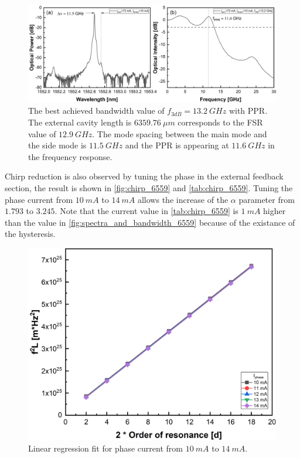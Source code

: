 \begin{figure}[ht]
    \centering
    \includegraphics[width=\linewidth]{figures/spectrum_and_bandwidth_6557.png}
    \caption{The best achieved bandwidth value of $f_{3dB}=13.2 \ GHz$ with PPR. The external cavity length is $6359.76 \ \mu m$ corresponds to the FSR value of $12.9 \ GHz$. The mode spacing between the main mode and the side mode is $11.5 \ GHz$ and the PPR is appearing at $11.6 \ GHz$ in the frequency response.}
    \label{fig:spectra_and_bandwidth_6557}
\end{figure}

Chirp reduction is also observed by tuning the phase in the external feedback section, the result is shown in \autoref{fig:chirp_6559} and \autoref{tab:chirp_6559}. Tuning the phase current from $10 \ mA$ to $14 \ mA$ allows the increase of the $\alpha$ parameter from $1.793$ to $3.245$. Note that the current value in \autoref{tab:chirp_6559} is $1 \ mA$ higher than the value in \autoref{fig:spectra_and_bandwidth_6559} because of the existance of the hysteresis.

\begin{figure}[H]
    \centering
    \includegraphics[width=.7\linewidth]{figures/chirp_6559.png}
    \caption{Linear regression fit for phase current from $10 \ mA$ to $14 \ mA$.}
    \label{fig:chirp_6559}
\end{figure}

